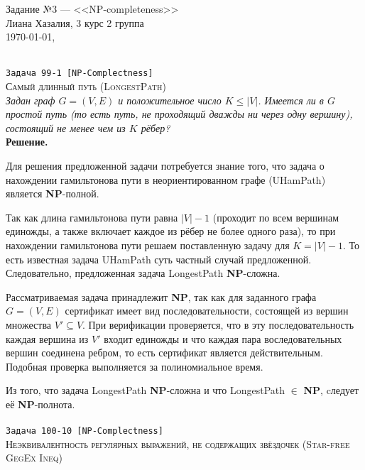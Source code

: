 \documentclass[10pt]{article}
\begin{document}
\def\chap#1#2{\ \\ {\large\bf#1 \ | \ \tt\scshape#2} \par}

{\bf
\begin{flushright}
\small{Задание №3 --- <<NP-completeness>> \\ Лиана Хазалия, 3 курс 2 группа\\  \today, \currenttime}
\end{flushright}}
\rm
\hline
\ \\[0.5 cm]
{\large\texttt{Задача 99-1 [NP-Complectness]}}
\\
\textsc{Самый длинный путь (LongestPath)}
\ \\[0.1cm]
\textit{Задан граф $G=(V,E)$ и положительное число $K\leq |V|$. Имеется ли в $G$ простой путь (то есть путь, не проходящий дважды ни через одну вершину), состоящий не менее чем из $K$ рёбер?}
\ \\[0.3cm]
\textbf{Решение.}  
\medskip\par Для решения предложенной задачи потребуется знание того, что задача о нахождении гамильтонова пути в неориентированном графе (UHamPath) является \textbf{NP}-полной.
\medskip\par Так как длина гамильтонова пути равна $|V|-1$ (проходит по всем вершинам единожды, а также включает каждое из рёбер не более одного раза), то при нахождении гамильтонова пути решаем поставленную задачу для $K=|V|-1$. То есть известная задача UHamPath суть частный случай предложенной. Следовательно, предложенная задача LongestPath \textbf{NP}-сложна.
\medskip\par Рассматриваемая задача принадлежит \textbf{NP}, так как для заданного графа $G=(V, E)$ сертификат имеет вид последовательности, состоящей из вершин множества $V'\subseteq V$. При верификации проверяется, что в эту последовательность каждая вершина из $V'$ входит единожды и что каждая пара воследовательных вершин соединена ребром, то есть сертификат является действительным. Подобная проверка выполняется за полиномиальное время. 
\medskip\par Из того, что задача LongestPath \textbf{NP}-сложна и что LongestPath $\in$ \textbf{NP}, cледует её \textbf{NP}-полнота.
\ \\[0.5 cm]
\hline
\ \\[0.5 cm]
{\large\texttt{Задача 100-10 [NP-Complectness]}}
\\
\textsc{Неэквивалентность регулярных выражений, не содержащих звёздочек (Star-free GegEx Ineq)}
\ \\[0.1cm]
\end{document}
